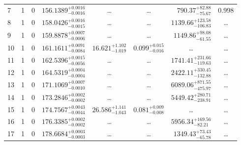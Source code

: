 \begin{table*}[!]
\begin{tabular}{llcrrlrc}
7 & 1 & 0 & $    156.1389_{-      0.0016}^{+      0.0016}$ & \multicolumn{1}{c}{\dots} & \multicolumn{1}{c}{\dots} & $      790.37_{-       75.67}^{+       82.88}$ & 0.998\\[1pt]
8 & 1 & 0 & $    158.0426_{-      0.0015}^{+      0.0016}$ & \multicolumn{1}{c}{\dots} & \multicolumn{1}{c}{\dots} & $     1139.66_{-      106.83}^{+      123.58}$ & \dots \\[1pt]
9 & 1 & 0 & $    159.8878_{-      0.0006}^{+      0.0007}$ & \multicolumn{1}{c}{\dots} & \multicolumn{1}{c}{\dots} & $     1149.86_{-       61.55}^{+       98.08}$ & \dots \\[1pt]
10 & 1 & 0 & $    161.1611_{-      0.0084}^{+      0.0091}$ & $      16.621_{-       1.019}^{+       1.102}$ & $       0.099_{-       0.016}^{+       0.015}$ & \multicolumn{1}{c}{\dots} & \dots \\[1pt]
11 & 1 & 0 & $    162.5396_{-      0.0056}^{+      0.0015}$ & \multicolumn{1}{c}{\dots} & \multicolumn{1}{c}{\dots} & $     1741.41_{-      119.63}^{+      231.66}$ & \dots \\[1pt]
12 & 1 & 0 & $    164.5319_{-      0.0004}^{+      0.0004}$ & \multicolumn{1}{c}{\dots} & \multicolumn{1}{c}{\dots} & $     2422.11_{-      132.88}^{+      330.45}$ & \dots \\[1pt]

13 & 1 & 0 & $    171.1069_{-      0.0010}^{+      0.0007}$ & \multicolumn{1}{c}{\dots} & \multicolumn{1}{c}{\dots} & $     6089.06_{-      475.97}^{+      871.55}$ & \dots \\[1pt]
14 & 1 & 0 & $    173.2846_{-      0.0002}^{+      0.0002}$ & \multicolumn{1}{c}{\dots} & \multicolumn{1}{c}{\dots} & $     5449.42_{-      238.91}^{+      280.71}$ & \dots \\[1pt]
15 & 1 & 0 & $    174.7567_{-      0.0044}^{+      0.0043}$ & $      26.586_{-       1.043}^{+       1.141}$ & $       0.081_{-       0.008}^{+       0.009}$ & \multicolumn{1}{c}{\dots} & \dots \\[1pt]
16 & 1 & 0 & $    176.3385_{-      0.0002}^{+      0.0002}$ & \multicolumn{1}{c}{\dots} & \multicolumn{1}{c}{\dots} & $     5956.34_{-       82.21}^{+      169.56}$ & \dots \\[1pt]
17 & 1 & 0 & $    178.6684_{-      0.0003}^{+      0.0003}$ & \multicolumn{1}{c}{\dots} & \multicolumn{1}{c}{\dots} & $     1349.43_{-       65.78}^{+       73.43}$ & \dots \\[1pt]


\end{tabular}
\end{table*}
